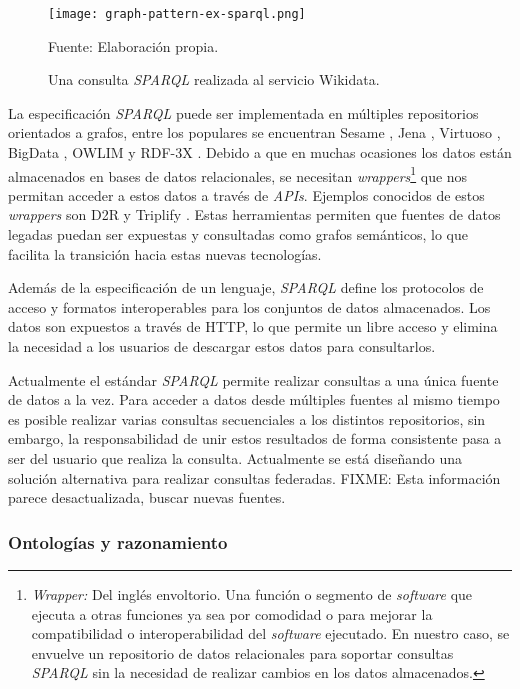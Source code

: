 \begin{figure}
    \centering
    \texttt{[image: graph-pattern-ex-sparql.png]}
    \caption{Una consulta \textit{SPARQL} realizada al servicio Wikidata.}
    Fuente: Elaboración propia.
    \label{fig:graph-pattern-ex-sparql}
\end{figure}

La especificación \textit{SPARQL} puede ser implementada en múltiples
repositorios orientados a grafos, entre los populares se encuentran Sesame
\cite{broekstra2002sesame}, Jena \cite{mcbride2001jena}, Virtuoso
\cite{openlink2015virtuoso}, BigData \cite{thompson2016bigdata}, OWLIM
\cite{kiryakov2005owlim} y RDF-3X \cite{neumann2010rdf}. Debido a que en muchas
ocasiones los datos están almacenados en bases de datos relacionales, se
necesitan \textit{wrappers}\footnote{\textit{Wrapper:} Del inglés envoltorio.
Una función o segmento de \textit{software} que ejecuta a otras funciones ya sea
por comodidad o para mejorar la compatibilidad o interoperabilidad del
\textit{software} ejecutado. En nuestro caso, se envuelve un repositorio de
datos relacionales para soportar consultas \textit{SPARQL} sin la necesidad de
realizar cambios en los datos almacenados.} que nos permitan acceder a estos
datos a través de \textit{APIs}. Ejemplos conocidos de estos \textit{wrappers}
son D2R \cite{bizer2006d2r} y Triplify \cite{auer2009triplify}. Estas
herramientas permiten que fuentes de datos legadas puedan ser expuestas y
consultadas como grafos semánticos, lo que facilita la transición hacia estas
nuevas tecnologías.

Además de la especificación de un lenguaje, \textit{SPARQL} define los
protocolos de acceso y formatos interoperables para los conjuntos de datos
almacenados. Los datos son expuestos a través de HTTP, lo que permite un libre
acceso y elimina la necesidad a los usuarios de descargar estos datos para
consultarlos.

Actualmente el estándar \textit{SPARQL} permite realizar consultas a una única
fuente de datos a la vez. Para acceder a datos desde múltiples fuentes al mismo
tiempo es posible realizar varias consultas secuenciales a los distintos
repositorios, sin embargo, la responsabilidad de unir estos resultados de forma
consistente pasa a ser del usuario que realiza la consulta. Actualmente se está
diseñando una solución alternativa para realizar consultas federadas. FIXME:
Esta información parece desactualizada, buscar nuevas fuentes.

\subsubsection{Ontologías y razonamiento}
\label{sec:ontologia-y-razonamiento}

